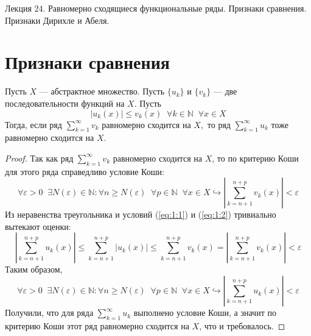 \documentclass[11pt]{article}
\begin{document}
\begin{titlepage}
    \centering
    \vspace*{\fill}  %

    {\Huge Лекция 24. Равномерно сходящиеся функциональные ряды. Признаки сравнения. Признаки Дирихле и Абеля.
    \par}

    \vspace*{\fill}  %
\end{titlepage}

\setcounter{page}{1}

\section{Признаки сравнения}

\begin{theorem}
    Пусть $X$ --- абстрактное множество. Пусть $\{u_k\}$ и $\{v_k\}$ --- две последовательности функций на $X$. Пусть 
    \begin{equation} \label{eq:1:1}
        \left\lvert u_k(x) \right\rvert \leq v_k(x) \; \; \forall k \in \mathbb{N} \; \; \forall x \in X
    \end{equation}
    Тогда, если ряд  
    $\displaystyle  \sum_{k = 1}^{\infty} v_k $
    равномерно сходится на $X,$ то ряд 
    $\displaystyle \sum_{k = 1}^{\infty} u_k $
    тоже равномерно сходится на $X$. 
\end{theorem}

\begin{proof}
    Так как ряд $\displaystyle \sum_{k = 1}^{\infty} v_k $ равномерно сходится на $X$, то по критерию Коши для этого ряда справедливо условие Коши:
    \begin{equation} \label{eq:1:2}
        \forall \varepsilon > 0 \; \; \exists N(\varepsilon) \in \mathbb{N}: \forall n \geq N(\varepsilon) \; \; \forall p \in \mathbb{N} \; \; \forall x \in X \hookrightarrow \left\lvert \sum_{k = n + 1}^{n + p} v_k(x) \right\rvert < \varepsilon
    \end{equation}
    Из неравенства треугольника и условий (\ref{eq:1:1}) и (\ref{eq:1:2}) тривиально вытекают оценки:
    \[\left\lvert \sum_{k = n + 1}^{n + p} u_k (x) \right\rvert \leq \sum_{k = n + 1}^{n + p} \left\lvert u_k (x) \right\rvert \leq \sum_{k = n + 1}^{n + p} v_k (x) = \left\lvert \sum_{k = n + 1}^{n + p} v_k(x) \right\rvert < \varepsilon\]
    Таким образом,
    \[\forall \varepsilon > 0 \; \; \exists N(\varepsilon) \in \mathbb{N}: \forall n \geq N(\varepsilon) \; \; \forall p \in \mathbb{N} \; \; \forall x \in X \hookrightarrow \left\lvert \sum_{k = n + 1}^{n + p} u_k (x) \right\rvert < \varepsilon\]
    Получили, что для ряда $\displaystyle \sum_{k = 1}^{\infty} u_k$ выполнено условие Коши, а значит по критерию Коши этот ряд равномерно сходится на $X$, что и требовалось.
\end{proof}
\end{document}
